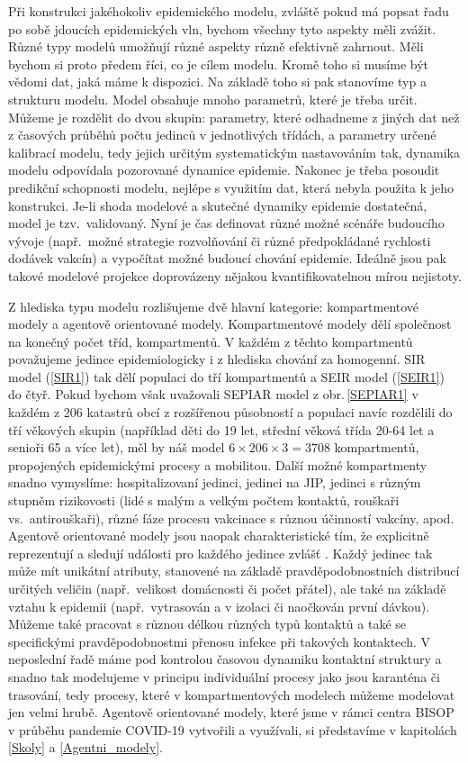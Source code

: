 Při konstrukci jakéhokoliv epidemického modelu, zvláště pokud má popsat řadu po sobě jdoucích epidemických vln, bychom všechny tyto aspekty měli zvážit. Různé typy modelů umožňují různé aspekty různě efektivně zahrnout. Měli bychom si proto předem říci, co je cílem modelu. Kromě toho si musíme být vědomi dat, jaká máme k dispozici. Na základě toho si pak stanovíme typ a strukturu modelu. Model obsahuje mnoho parametrů, které je třeba určit. Můžeme je rozdělit do dvou skupin: parametry, které odhadneme z jiných dat než z časových průběhů počtu jedinců v jednotlivých třídách, a parametry určené kalibrací modelu, tedy jejich určitým systematickým nastavováním tak, dynamika modelu odpovídala pozorované dynamice epidemie. Nakonec je třeba posoudit predikční schopnosti modelu, nejlépe s využitím dat, která nebyla použita k jeho konstrukci. Je-li shoda modelové a skutečné dynamiky epidemie dostatečná, model je tzv.\ validovaný. Nyní je čas definovat různé možné scénáře budoucího vývoje (např.\ možné strategie rozvolňování či různé předpokládané rychlosti dodávek vakcín) a vypočítat možné budoucí chování epidemie. Ideálně jsou pak takové modelové projekce doprovázeny nějakou kvantifikovatelnou mírou nejistoty.

Z hlediska typu modelu rozlišujeme dvě hlavní kategorie: kompartmentové modely a agentově orientované modely. Kompartmentové modely dělí společnost na konečný počet tříd, kompartmentů. V každém z těchto kompartmentů považujeme jedince epidemiologicky i z hlediska chování za homogenní. SIR model (\ref{SIR1}) tak dělí populaci do tří kompartmentů a SEIR model (\ref{SEIR1}) do čtyř. Pokud bychom však uvažovali SEPIAR model z obr.\,\ref{SEPIAR1} v každém z 206 katastrů obcí z rozšířenou působností a populaci navíc rozdělili do tří věkových skupin (například děti do 19 let, střední věková třída 20-64 let a senioři 65 a více let), měl by náš model $6 \times 206 \times 3 = 3708$ kompartmentů, propojených epidemickými procesy a mobilitou. Další možné kompartmenty snadno vymyslíme: hospitalizovaní jedinci, jedinci na JIP, jedinci s různým stupněm rizikovosti (lidé s malým a velkým počtem kontaktů, rouškaři vs.\ antirouškaři), různé fáze procesu vakcinace s různou účinností vakcíny, apod. Agentově orientované modely jsou naopak charakteristické tím, že explicitně reprezentují a sledují události pro každého jedince zvlášť \cite{Smith_etal2018}. Každý jedinec tak může mít unikátní atributy, stanovené na základě pravděpodobnostních distribucí určitých veličin (např.\ velikost domácnosti či počet přátel), ale také na základě vztahu k epidemii (např.\ vytrasován a v izolaci či naočkován první dávkou). Můžeme také pracovat s různou délkou různých typů kontaktů a také se specifickými pravděpodobnostmi přenosu infekce při takových kontaktech. V neposlední řadě máme pod kontrolou časovou dynamiku kontaktní struktury a snadno tak modelujeme v principu individuální procesy jako jsou karanténa či trasování, tedy procesy, které v kompartmentových modelech můžeme modelovat jen velmi hrubě. Agentově orientované modely, které jsme v rámci centra BISOP v průběhu pandemie COVID-19 vytvořili a využívali, si představíme v kapitolách \ref{Skoly} a \ref{Agentni_modely}.  

